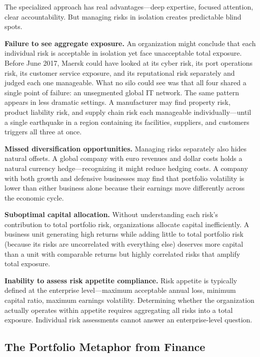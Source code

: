 \documentclass[11pt,openany]{book}
\begin{document}
The specialized approach has real advantages---deep expertise, focused
attention, clear accountability. But managing risks in isolation creates
predictable blind spots.

\textbf{Failure to see aggregate exposure.} An organization might conclude
that each individual risk is acceptable in isolation yet face unacceptable
total exposure. Before June 2017, Maersk could have looked at its cyber risk,
its port operations risk, its customer service exposure, and its reputational
risk separately and judged each one manageable. What no silo could see was
that all four shared a single point of failure: an unsegmented global IT
network. The same pattern appears in less dramatic settings. A manufacturer
may find property risk, product liability risk, and supply chain risk each
manageable individually---until a single earthquake in a region containing its
facilities, suppliers, and customers triggers all three at once.

\textbf{Missed diversification opportunities.} Managing risks separately also
hides natural offsets. A global company with euro revenues and dollar costs
holds a natural currency hedge---recognizing it might reduce hedging costs. A
company with both growth and defensive businesses may find that portfolio
volatility is lower than either business alone because their earnings move
differently across the economic cycle.

\textbf{Suboptimal capital allocation.} Without understanding each risk's
contribution to total portfolio risk, organizations allocate capital
inefficiently. A business unit generating high returns while adding little to
total portfolio risk (because its risks are uncorrelated with everything else)
deserves more capital than a unit with comparable returns but highly
correlated risks that amplify total exposure.

\textbf{Inability to assess risk appetite compliance.} Risk appetite is
typically defined at the enterprise level---maximum acceptable annual loss,
minimum capital ratio, maximum earnings volatility. Determining whether the
organization actually operates within appetite requires aggregating all risks
into a total exposure. Individual risk assessments cannot answer an
enterprise-level question.

\subsection{The Portfolio Metaphor from Finance}
\label{subsec:portfolio-metaphor}
\end{document}
